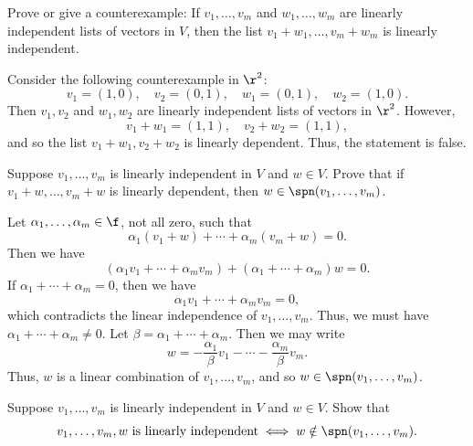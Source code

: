 \begin{exercise}[2a11]
    Prove or give a counterexample: If $v_1, \ldots, v_m$ and $w_1, \ldots, w_m$ are linearly independent lists of vectors in $V$, then the list $v_1 + w_1, \ldots, v_m + w_m$ is linearly independent.
\end{exercise}

\begin{sol}
    Consider the following counterexample in $\r^2$:
    \[v_1 = (1, 0), \quad v_2 = (0, 1), \quad w_1 = (0, 1), \quad w_2 = (1, 0).\]
    Then $v_1, v_2$ and $w_1, w_2$ are linearly independent lists of vectors in $\r^2$. However,
    \[v_1 + w_1 = (1, 1), \quad v_2 + w_2 = (1, 1),\]
    and so the list $v_1 + w_1, v_2 + w_2$ is linearly dependent. Thus, the statement is false.
\end{sol}
 
\begin{exercise}[2a12]
    Suppose $v_1, \ldots, v_m$ is linearly independent in $V$ and $w \in V$. Prove that if $v_1 + w, \ldots, v_m + w$ is linearly dependent, then $w \in \spn(v_1, \ldots, v_m)$.
\end{exercise}

\begin{sol}
    Let $\alpha_1, \ldots, \alpha_m \in \f$, not all zero, such that
    \[\alpha_1(v_1 + w) + \cdots + \alpha_m(v_m + w) = 0.\]
    Then we have
    \[(\alpha_1 v_1 + \cdots + \alpha_m v_m) + (\alpha_1 + \cdots + \alpha_m)w = 0.\]
    If $\alpha_1 + \cdots + \alpha_m = 0$, then we have
    \[\alpha_1 v_1 + \cdots + \alpha_m v_m = 0,\]
    which contradicts the linear independence of $v_1, \ldots, v_m$. Thus, we must have $\alpha_1 + \cdots + \alpha_m \neq 0$. Let $\beta = \alpha_1 + \cdots + \alpha_m$. Then we may write
    \[w = -\frac{\alpha_1}{\beta}v_1 - \cdots - \frac{\alpha_m}{\beta}v_m.\]
    Thus, $w$ is a linear combination of $v_1, \ldots, v_m$, and so $w \in \spn(v_1, \ldots, v_m)$.
\end{sol}
 
\begin{exercise}[2a13]
    Suppose $v_1, \ldots, v_m$ is linearly independent in $V$ and $w \in V$. Show that
    \[v_1, \ldots, v_m, w \text{ is linearly independent} \iff w \notin \spn(v_1, \ldots, v_m).\]
\end{exercise}

